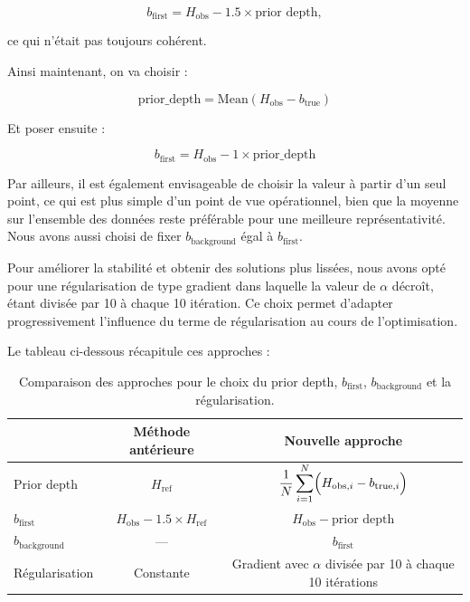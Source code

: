\documentclass{article}
\begin{document}
\[
b_{\text{first}} = H_{\text{obs}} - 1.5 \times \text{prior depth},
\]



ce qui n'était pas toujours cohérent.

Ainsi maintenant, on va choisir :



\[
\text{prior\_depth} = \text{Mean}(H_{\text{obs}} - b_{\text{true}})
\]



Et poser ensuite :



\[
b_{\text{first}} = H_{\text{obs}} - 1 \times \text{prior\_depth}
\]











Par ailleurs, il est également envisageable de choisir la valeur à partir d'un seul point, ce qui est plus simple d'un point de vue opérationnel, bien que la moyenne sur l'ensemble des données reste préférable pour une meilleure représentativité. Nous avons aussi choisi de fixer \(b_{\text{background}}\) égal à \(b_{\text{first}}\). \newline

Pour améliorer la stabilité et obtenir des solutions plus lissées, nous avons opté pour une régularisation de type gradient dans laquelle la valeur de \(\alpha\) décroît, étant divisée par 10 à chaque 10 itération. Ce choix permet d'adapter progressivement l'influence du terme de régularisation au cours de l'optimisation.

Le tableau ci-dessous récapitule ces approches :

\begin{table}[H]
    \centering
    \begin{tabular}{|l|c|c|}
    \hline
                               & Méthode antérieure & Nouvelle approche \\ \hline
    Prior depth              & \(H_{\text{ref}}\) & \(\dfrac{1}{N}\displaystyle\sum_{i=1}^{N}\Bigl( H_{\text{obs},i} - b_{\text{true},i}\Bigr)\) \\ \hline
    \(b_{\text{first}}\)       & \(H_{\text{obs}} - 1.5 \times H_{\text{ref}}\) & \(H_{\text{obs}} - \text{prior depth}\) \\ \hline
    \(b_{\text{background}}\)  & --- & \(b_{\text{first}}\) \\ \hline
    Régularisation           & Constante & Gradient avec \(\alpha\) divisée par 10 à chaque 10 itérations \\ \hline
    \end{tabular}
    \caption{Comparaison des approches pour le choix du prior depth, \(b_{\text{first}}\), \(b_{\text{background}}\) et la régularisation.}
    \label{tab:prior_depth_bfirst}
\end{table}
\end{document}

